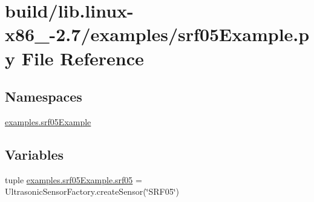 \hypertarget{build_2lib_8linux-x86__64-2_87_2examples_2srf05Example_8py}{}\section{build/lib.linux-\/x86\+\_-\/2.7/examples/srf05\+Example.py File Reference}
\label{build_2lib_8linux-x86__64-2_87_2examples_2srf05Example_8py}
\subsection*{Namespaces}
\begin{DoxyCompactItemize}
\item 
 \hyperlink{namespaceexamples_1_1srf05Example}{examples.\+srf05\+Example}
\end{DoxyCompactItemize}
\subsection*{Variables}
\begin{DoxyCompactItemize}
\item 
tuple \hyperlink{namespaceexamples_1_1srf05Example_ac0f70299a8fe79d18932533be7295a16}{examples.\+srf05\+Example.\+srf05} = Ultrasonic\+Sensor\+Factory.\+create\+Sensor(\char`\"{}S\+R\+F05\char`\"{})
\end{DoxyCompactItemize}
